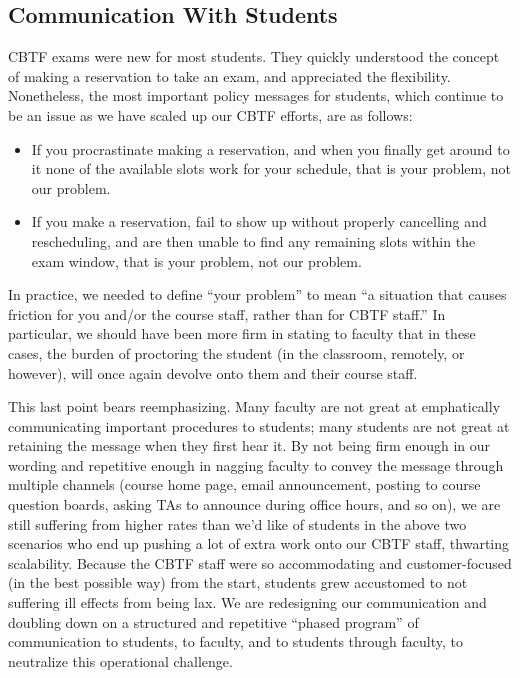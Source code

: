 \subsection{Communication With Students}


CBTF exams were new for most students.
They quickly understood the concept of making a reservation to take
an exam, and appreciated the flexibility.
Nonetheless, the most important policy messages for students, which
continue to be an issue as we have scaled up our CBTF efforts, are as
follows:

\begin{itemize}

\item If you procrastinate making a reservation, and
when you finally get around to it none of the
available slots work for your schedule, that is your problem, not our
problem.

\item If you make a reservation, fail to show up without properly cancelling
and rescheduling, and are then unable to find any remaining slots
within the exam window, that is your problem, not our problem.

\end{itemize}

In practice, we needed to define ``your problem'' to
mean ``a situation that causes friction for you and/or the course
staff, rather than for CBTF staff.''
In particular, we should have been more firm in stating to faculty
that in these cases, the burden of proctoring the student (in the
classroom, remotely, or however), will once again devolve onto them
and their course staff.

This last point bears reemphasizing.
Many faculty are not great at emphatically communicating important
procedures to students; many students are not great at retaining the
message when they first hear it.
By not being firm enough in our wording and repetitive enough in
nagging faculty to convey the message through multiple channels
(course home page, email announcement, posting to course question
boards, asking TAs to announce during office hours, and so on), we are
still suffering from higher rates than we'd like of students in the
above two scenarios who end up pushing a lot of extra work onto our
CBTF staff, thwarting scalability.
Because the CBTF staff were so accommodating and customer-focused (in
the best possible way) from the start, students grew accustomed to not
suffering ill effects from being lax.
We are redesigning our communication and doubling down on a
structured and repetitive ``phased program'' of communication to
students, to faculty, and to students through faculty, to neutralize
this operational challenge.

